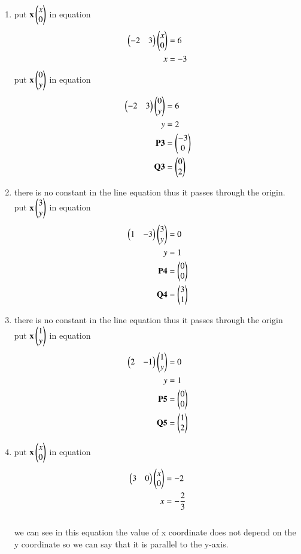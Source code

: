 \begin{enumerate}[label=\arabic*.,ref=\thesubsection.\theenumi]
\begin{enumerate}
\item put $\mathbf {x} \begin{pmatrix}x\\0\end{pmatrix}$ in equation 
\begin{align}
\begin{pmatrix}-2 & 3\end{pmatrix}\begin{pmatrix}x\\0\end{pmatrix} &= 6
\\
x&= -3
\end{align}
put $\mathbf {x} \begin{pmatrix}0\\y\end{pmatrix}$ in equation
\\
\begin{align}
\begin{pmatrix}-2 & 3\end{pmatrix}\begin{pmatrix}0\\y\end{pmatrix}& = 6
\\
y&= 2
\\
\mathbf{P3} &= \begin{pmatrix}-3\\0\end{pmatrix}
\\ \mathbf{Q3} &= \begin{pmatrix}0\\2\end{pmatrix}
\end{align}




\item there is no constant in the line equation thus it passes through the origin.
\\
put $\mathbf {x} \begin{pmatrix}3\\y\end{pmatrix}$ in equation
\\
\begin{align}
\begin{pmatrix}1 & -3\end{pmatrix}\begin{pmatrix}3\\y\end{pmatrix} &= 0
\\
y&= 1
\\
\mathbf{P4} &= \begin{pmatrix}0\\0\end{pmatrix}
\\ \mathbf{Q4} &= \begin{pmatrix}3\\1\end{pmatrix}
\end{align}


\item there is no constant in the line equation thus it passes through the origin
\\
put $\mathbf {x} \begin{pmatrix}1\\y\end{pmatrix}$ in equation
\\
\begin{align}
\begin{pmatrix}2 & -1\end{pmatrix}\begin{pmatrix}1\\y\end{pmatrix} &= 0
\\
y&= 1
\\
\mathbf{P5}& = \begin{pmatrix}0\\0\end{pmatrix}
\\ \mathbf{Q5} &= \begin{pmatrix}1\\2\end{pmatrix}
\end{align}


\item put $\mathbf {x} \begin{pmatrix}x\\0\end{pmatrix}$ in equation
\begin{align}
\begin{pmatrix}3 & 0\end{pmatrix}\begin{pmatrix}x\\0\end{pmatrix}&= -2
\\
x&= -\frac{2}{3}
\end{align}
\\
we can see in this equation the  value of x coordinate does not depend on the y coordinate so we can say that it is parallel to the y-axis.






\end{enumerate}
\end{enumerate}
